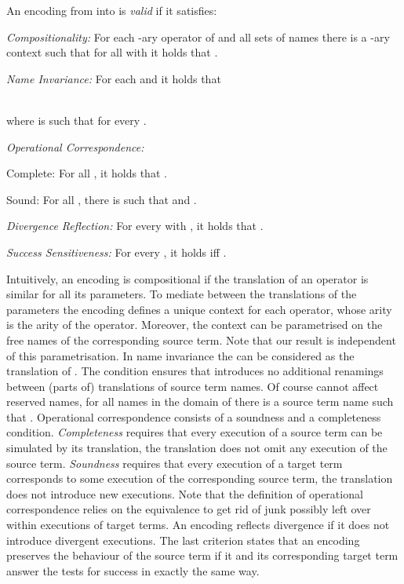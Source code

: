\documentclass[final,copyright,creativecommons]{eptcs}
\begin{document}
\begin{definition}
	An encoding from  into  is \emph{valid} if it satisfies:
	\begin{compactenum}
		\item[\textit{Compositionality:}] For each -ary operator  of  and all sets of names  there is a -ary context  such that for all  with  it holds that .
		\item[\textit{Name Invariance:}] For each  and  it holds that
			\vspace*{-0.5em}
			
			\vspace*{-1em}\\
where  is such that  for every .
		\item[\textit{Operational Correspondence:}] 
			\begin{compactenum}
				\item[Complete:] For all , it holds that .
				\item[Sound:] For all , there is  such that  and .
			\end{compactenum}
		\item[\textit{Divergence Reflection:}] For every  with , it holds that .
		\item[\textit{Success Sensitiveness:}] For every , it holds  iff .
	\end{compactenum}
\end{definition}

Intuitively, an encoding is compositional if the translation of an operator is similar for all its parameters. To mediate between the translations of the parameters the encoding defines a unique context for each operator, whose arity is the arity of the operator. Moreover, the context can be parametrised on the free names of the corresponding source term. Note that our result is independent of this parametrisation.
In name invariance the  can be considered as the translation of . The condition  ensures that  introduces no additional renamings between (parts of) translations of source term names. Of course  cannot affect reserved names, \ie for all names  in the domain of  there is a source term name  such that .
Operational correspondence consists of a soundness and a completeness condition. \emph{Completeness} requires that every execution of a source term can be simulated by its translation, \ie the translation does not omit any execution of the source term. \emph{Soundness} requires that every execution of a target term corresponds to some execution of the corresponding source term, \ie the translation does not introduce new executions.
Note that the definition of operational correspondence relies on the equivalence  to get rid of junk possibly left over within executions of target terms. An encoding reflects divergence if it does not introduce divergent executions.
The last criterion states that an encoding preserves the behaviour of the source term if it and its corresponding target term answer the tests for success in exactly the same way.
\end{document}
